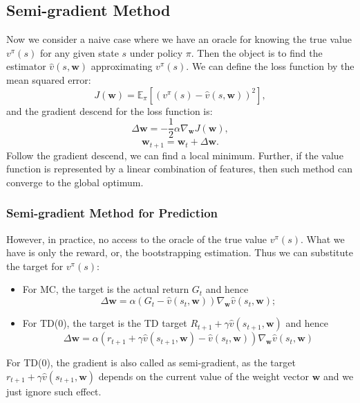 \documentclass{progartcn}
\begin{document}
		\subsection{Semi-gradient Method}

			Now we consider a naive case where we have an oracle for knowing the true value $v^\pi(s)$ for any given state $s$ under policy $\pi$. Then the object is to find the estimator $\hat{v}(s,\bm{w})$ approximating $v^\pi(s)$. We can define the loss function by the mean squared error:
			\[J(\bm{w})=\mathbb{E}_\pi[(v^\pi(s)-\hat v(s,\bm{w}))^2],\]
			and the gradient descend for the loss function is:
			\[\Delta\bm{w}=-\frac{1}{2}\alpha \nabla_{\bm{w}} J(\bm{w}),\]
			\[\bm{w}_{t+1}=\bm{w}_t+\Delta\bm{w}.\]
			Follow the gradient descend, we can find a local minimum. Further, if the value function is represented by a linear combination of features, then such method can converge to the global optimum.\\

			\subsubsection{Semi-gradient Method for Prediction} %

				However, in practice, no access to the oracle of the true value $v^\pi(s)$. What we have is only the reward, or, the bootstrapping estimation. Thus we can substitute the target for $v^\pi(s)$:
				\begin{itemize}[noitemsep,topsep=0pt]
					\item For MC, the target is the actual return $G_t$ and hence
					\[\Delta \bm{w}=\alpha(G_t-\hat{v}(s_t,\bm{w}))\nabla_{\bm{w}} \hat{v}(s_t,\bm{w});\]
					\item For TD(0), the target is the TD target $R_{t+1}+\gamma\hat{v}(s_{t+1},\bm{w})$ and hence
					\[\Delta \bm{w}=\alpha(r_{t+1}+\gamma\hat{v}(s_{t+1},\bm{w})-\hat{v}(s_t,\bm{w}))\nabla_{\bm{w}} \hat{v}(s_t,\bm{w})\]
				\end{itemize}

				For TD(0), the gradient is also called as semi-gradient, as the target $r_{t+1}+\gamma\hat{v}(s_{t+1},\bm{w})$ depends on the current value of the weight vector $\bm{w}$ and we just ignore such effect.
\end{document}
